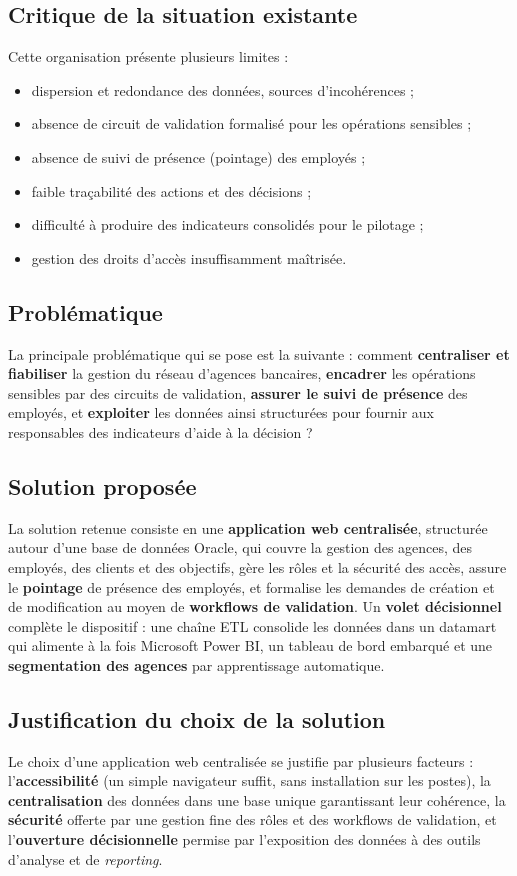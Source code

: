 \subsection{Critique de la situation existante}
Cette organisation présente plusieurs limites :
\begin{itemize}[noitemsep]
  \item dispersion et redondance des données, sources d'incohérences ;
  \item absence de circuit de validation formalisé pour les opérations sensibles ;
  \item absence de suivi de présence (pointage) des employés ;
  \item faible traçabilité des actions et des décisions ;
  \item difficulté à produire des indicateurs consolidés pour le pilotage ;
  \item gestion des droits d'accès insuffisamment maîtrisée.
\end{itemize}

\subsection{Problématique}
La principale problématique qui se pose est la suivante : comment
\textbf{centraliser et fiabiliser} la gestion du réseau d'agences bancaires,
\textbf{encadrer} les opérations sensibles par des circuits de validation,
\textbf{assurer le suivi de présence} des employés, et \textbf{exploiter} les
données ainsi structurées pour fournir aux responsables des indicateurs d'aide à
la décision ?

\subsection{Solution proposée}
La solution retenue consiste en une \textbf{application web centralisée},
structurée autour d'une base de données Oracle, qui couvre la gestion des agences,
des employés, des clients et des objectifs, gère les rôles et la sécurité des
accès, assure le \textbf{pointage} de présence des employés, et formalise les
demandes de création et de modification au moyen de \textbf{workflows de
validation}. Un \textbf{volet décisionnel} complète le dispositif : une chaîne ETL
consolide les données dans un datamart qui alimente à la fois Microsoft Power BI,
un tableau de bord embarqué et une \textbf{segmentation des agences} par
apprentissage automatique.

\subsection{Justification du choix de la solution}
Le choix d'une application web centralisée se justifie par plusieurs facteurs :
l'\textbf{accessibilité} (un simple navigateur suffit, sans installation sur les
postes), la \textbf{centralisation} des données dans une base unique garantissant
leur cohérence, la \textbf{sécurité} offerte par une gestion fine des rôles et des
workflows de validation, et l'\textbf{ouverture décisionnelle} permise par
l'exposition des données à des outils d'analyse et de \emph{reporting}.

